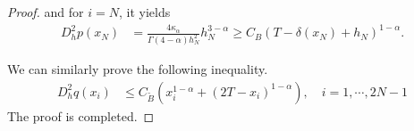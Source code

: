\documentclass{amsart}
\theoremstyle{definition}
\theoremstyle{remark}
\numberwithin{equation}{section}
\begin{document}
\begin{proof}
  and for $i=N$, it yields
  \begin{equation*}
    \begin{aligned}
      D_h^2 p(x_N) 
          & = \frac{4 \kappa_\alpha}{\Gamma(4-\alpha) h_N^2} h_N^{3-\alpha}
          \ge C_B (T - \delta(x_N)+h_N)^{1-\alpha} .
    \end{aligned}
  \end{equation*}


  We can similarly prove the following inequality.
  \begin{equation*}
    \begin{aligned}
      D_h^2 q(x_i) 
          & \le C_{\tilde{B}}  (x_{i}^{1-\alpha} + (2T-x_{i})^{1-\alpha}), \quad i=1,\cdots, 2N-1 
    \end{aligned}
  \end{equation*}
  The proof is completed.
\end{proof}
\end{document}
